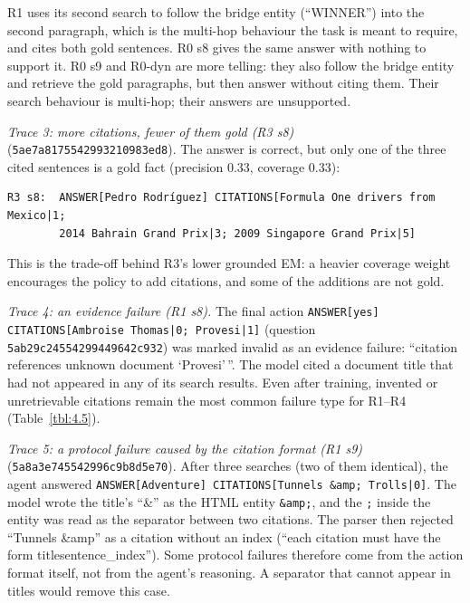 R1 uses its second search to follow the bridge entity (``WINNER'') into
the second paragraph, which is the multi-hop behaviour the task is meant
to require, and cites both gold sentences. R0 s8 gives the same answer
with nothing to support it. R0 s9 and R0-dyn are more telling: they also
follow the bridge entity and retrieve the gold paragraphs, but then
answer without citing them. Their search behaviour is multi-hop; their
answers are unsupported.

\emph{Trace 3: more citations, fewer of them gold (R3 s8)}
(\texttt{5ae7\allowbreak{}a817\allowbreak{}5542\allowbreak{}9932\allowbreak{}1098\allowbreak{}3ed8\allowbreak{}}).
The answer is correct, but only one of the three cited sentences is a
gold fact (precision 0.33, coverage 0.33):

\begin{Verbatim}
R3 s8:  ANSWER[Pedro Rodríguez] CITATIONS[Formula One drivers from Mexico|1;
        2014 Bahrain Grand Prix|3; 2009 Singapore Grand Prix|5]
\end{Verbatim}

This is the trade-off behind R3's lower grounded EM: a heavier coverage
weight encourages the policy to add citations, and some of the additions
are not gold.

\emph{Trace 4: an evidence failure (R1 s8).} The final action
\texttt{ANSWER{[}\allowbreak{}yes{]} CITATIONS{[}\allowbreak{}Ambroise Thomas|0; Provesi|1{]}}
(question
\texttt{5ab2\allowbreak{}9c24\allowbreak{}5542\allowbreak{}9944\allowbreak{}9642\allowbreak{}c932\allowbreak{}})
was marked invalid as an evidence failure: ``citation references unknown
document `Provesi'\,''. The model cited a document title that had not
appeared in any of its search results. Even after training, invented or
unretrievable citations remain the most common failure type for R1--R4
(Table~\ref{tbl:4.5}).

\emph{Trace 5: a protocol failure caused by the citation format (R1 s9)}
(\texttt{5a8a\allowbreak{}3e74\allowbreak{}5542\allowbreak{}996c\allowbreak{}9b8d\allowbreak{}5e70\allowbreak{}}).
After three searches (two of them identical), the agent answered
\texttt{ANSWER{[}\allowbreak{}Adventure{]} CITATIONS{[}\allowbreak{}Tunnels \&amp; Trolls|0{]}}.
The model wrote the title's ``\&'' as the HTML entity \texttt{\&amp;},
and the \texttt{;} inside the entity was read as the separator between
two citations. The parser then rejected ``Tunnels \&amp'' as a citation
without an index (``each citation must have the form
title\textbar sentence\_index''). Some protocol failures therefore come
from the action format itself, not from the agent's reasoning. A
separator that cannot appear in titles would remove this case.

